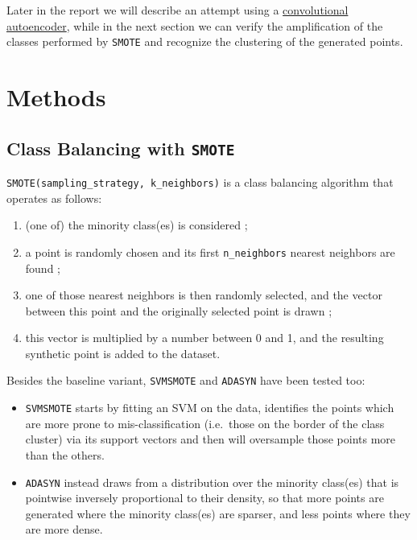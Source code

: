 \documentclass{acm_proc_article-sp}
\providecommand{\tightlist}{%
  \setlength{\itemsep}{0pt}\setlength{\parskip}{0pt}}
\begin{document}
Later in the report we will describe an attempt using a
\protect\hyperlink{ae}{convolutional autoencoder}, while in the next
section we can verify the amplification of the classes performed by
\texttt{SMOTE} and recognize the clustering of the generated points.

\hypertarget{methods}{%
\section{Methods}\label{methods}}

\hypertarget{smote}{%
\subsection{\texorpdfstring{Class Balancing with
\texttt{SMOTE}}{Class Balancing with SMOTE}}\label{smote}}

\texttt{SMOTE(sampling\_strategy,\ k\_neighbors)} is a class balancing
algorithm that operates as follows:

\begin{enumerate}
\def\labelenumi{\arabic{enumi}.}
\tightlist
\item
  (one of) the minority class(es) is considered ;
\item
  a point is randomly chosen and its first \texttt{n\_neighbors} nearest
  neighbors are found ;
\item
  one of those nearest neighbors is then randomly selected, and the
  vector between this point and the originally selected point is drawn ;
\item
  this vector is multiplied by a number between 0 and 1, and the
  resulting synthetic point is added to the dataset.
\end{enumerate}

Besides the baseline variant, \texttt{SVMSMOTE} and \texttt{ADASYN} have
been tested too:

\begin{itemize}
\tightlist
\item
  \texttt{SVMSMOTE} starts by fitting an SVM on the data, identifies the
  points which are more prone to mis-classification (i.e.~those on the
  border of the class cluster) via its support vectors and then will
  oversample those points more than the others.
\item
  \texttt{ADASYN} instead draws from a distribution over the minority
  class(es) that is pointwise inversely proportional to their density,
  so that more points are generated where the minority class(es) are
  sparser, and less points where they are more dense.
\end{itemize}
\end{document}
